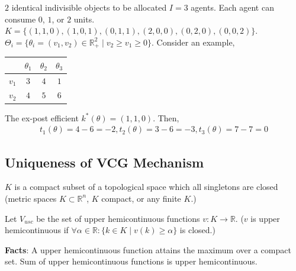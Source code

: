 \documentclass[11pt]{elegantbook}
\begin{document}
\begin{example}
    $2$ identical indivisible objects to be allocated $I=3$ agents. Each agent can consume $0$, $1$, or $2$ units. $K=\{(1,1,0),(1,0,1),(0,1,1),(2,0,0),(0,2,0),(0,0,2)\}$. $\Theta_i=\{\theta_i=(v_1,v_2)\in \mathbb{R}^2_+\mid v_2\geq v_1\geq 0\}$. Consider an example,
    \begin{center}
        \begin{tabular}{c|c|c|c}
            \hline
                &$\theta_1$ &$\theta_2$&$\theta_3$\\
            \hline
                $v_1$&$3$ &$4$&$1$\\
            \hline
                $v_2$&$4$ &$5$&$6$\\
            \hline
        \end{tabular}
    \end{center}
    The ex-post efficient $k^*(\theta)=(1,1,0)$. Then,
    \begin{equation}
        \begin{aligned}
            t_1(\theta)=4-6=-2, t_2(\theta)=3-6=-3, t_3(\theta)=7-7=0
        \end{aligned}
        \nonumber
    \end{equation}
\end{example}


\subsection{Uniqueness of VCG Mechanism}
\begin{assumption}
    $K$ is a compact subset of a topological space which all singletons are closed (metric spaces $K\subset \mathbb{R}^n$, $K$ compact, or any finite $K$.)
\end{assumption}

Let $V_{usc}$ be the set of upper hemicontinuous functions $v: K \rightarrow \mathbb{R}$. ($v$ is upper hemicontinuous if $\forall \alpha\in \mathbb{R}: \{k\in K\mid v(k)\geq \alpha\}$ is closed.)

\textbf{Facts}: A upper hemicontinuous function attains the maximum over a compact set. Sum of upper hemicontinuous functions is upper hemicontinuous.
\end{document}
